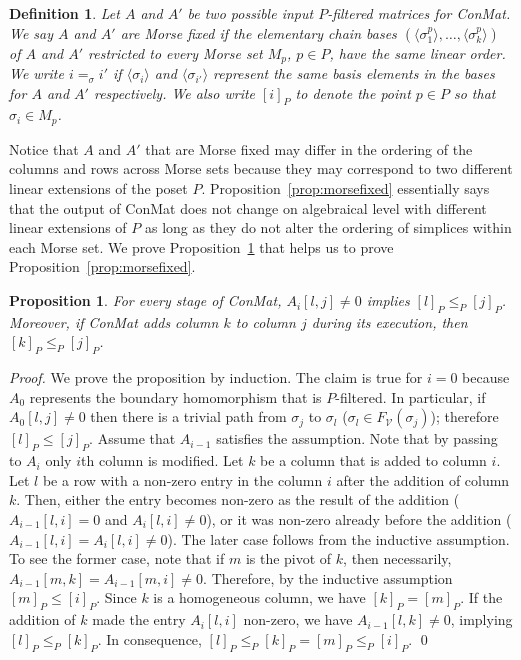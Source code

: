 \documentclass[a4paper,english,cleveref]{article}
\theoremstyle{plain}
\newtheorem{prop}{Proposition}[section]
\newtheorem{definition}{Definition}[section]
\def\cV{\text{$\mathcal V$}}
\newcounter{li}
\begin{document}
\begin{definition}
Let $A$ and $A'$ be two possible input $P$-filtered matrices for {\sc ConMat}.
We say $A$ and $A'$ are
\emph{Morse fixed} if the elementary chain bases $(\langle \sigma_{1}^p\rangle,\ldots, \langle \sigma_{k}^p\rangle)$ 
of $A$ and $A'$ restricted to every Morse set $M_p$, $p\in P$,
have the same linear order. We write $i=_\sigma i'$ if $\langle \sigma_i\rangle$
and $\langle \sigma_{i'}\rangle$ represent the same basis elements
in the bases for $A$ and $A'$ respectively. We also write $[i]_P$ to denote
the point $p\in P$ so that $\sigma_i\in M_p$.
\end{definition}

Notice that $A$ and $A'$ that are Morse fixed may differ in the ordering of
the columns and rows across Morse sets because they may correspond to
two different linear extensions of the poset $P$. Proposition~\ref{prop:morsefixed} essentially
says that the output of {\sc ConMat} does not change on algebraical level with different linear extensions
of $P$ as long as they do not alter the ordering of simplices within
each Morse set. We prove Proposition~\ref{prop:morsepath} that helps us to
prove Proposition~\ref{prop:morsefixed}.

\begin{prop}
    For every stage of {\sc ConMat}, $A_i[l,j]\neq 0$ implies $[l]_P\leq_P [j]_P$.
    Moreover, if {\sc ConMat} adds column $k$ to column $j$ during its execution, then
    $[k]_P\leq_P [j]_P$.
    \label{prop:morsepath}
\end{prop}
\begin{proof}
    We prove the proposition by induction.
    The claim is true for $i=0$ because $A_0$ represents the boundary homomorphism that is $P$-filtered.
    In particular, if $A_0[l,j]\neq 0$ then there is a trivial path from $\sigma_j$ to $\sigma_l$ ($\sigma_l\in F_\cV(\sigma_j)$);
        therefore $[l]_P\leq[j]_P$.
    Assume that $A_{i-1}$ satisfies the assumption.
    Note that by passing to $A_{i}$ only $i$th column is modified. 
    Let $k$ be a column that is added to column $i$.
    Let $l$ be a row with a non-zero entry in the column $i$ after the addition of column $k$.
    Then, either the entry becomes non-zero as the result of the addition ($A_{i-1}[l,i]= 0$ and $A_{i}[l,i]\neq 0$), or it was non-zero already before the addition ($A_{i-1}[l,i]=A_{i}[l,i]\neq0$).
    The later case follows from the inductive assumption.
    To see the former case, note that 
        if $m$ is the pivot of $k$, then necessarily, $A_{i-1}[m,k]=A_{i-1}[m,i]\neq 0$.
    Therefore, by the inductive assumption $[m]_P\leq [i]_P$.
    Since $k$ is a homogeneous column, we have $[k]_P=[m]_P$.
    If the addition of $k$ made the entry $A_{i}[l,i]$ non-zero, 
        we have $A_{i-1}[l,k]\neq 0$, implying $[l]_P\leq_P [k]_P$.
    In consequence, $[l]_P\leq_P [k]_P=[m]_P\leq_P[i]_P$.
    \qed
\end{proof}
\end{document}
